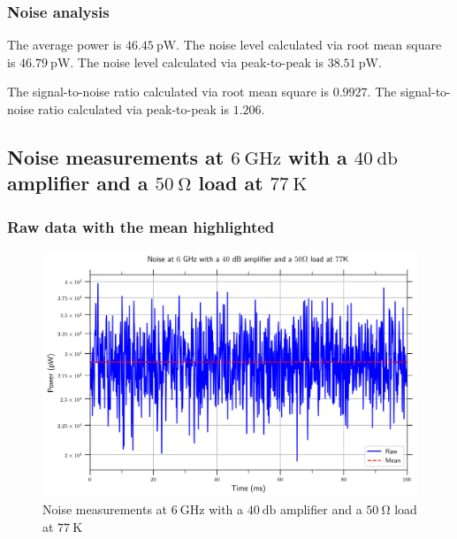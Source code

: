 \documentclass[english,12pt,a4paper]{article}
\begin{document}
\hypertarget{noise-analysis}{%
	\subsubsection{Noise analysis}\label{noise-analysis_4}}



	The average power is $\qty{46.45}{\pico\watt}$.
	The noise level calculated via root mean square is $\qty{46.79}{\pico\watt}$.
	The noise level calculated via peak-to-peak is $\qty{38.51}{\pico\watt}$.
	
	The signal-to-noise ratio calculated via root mean square is $0.9927$.
	The signal-to-noise ratio calculated via peak-to-peak is $1.206$.
	
\subsection{Noise measurements at $\qty{6}{\giga\hertz}$ with a $\qty{40}{\decibel}$ amplifier and a $\qty{50}{\ohm}$ load at $\qty{77}{\kelvin}$}

\hypertarget{raw-data-with-the-mean-highlighted}{%
	\subsubsection{Raw data with the mean
		highlighted}\label{raw-data-with-the-mean-highlighted_7}}

\begin{figure}[H]
	\includegraphics[width=1\linewidth]{Plots/noise_floor_6_GHz_amplif_50ohm_lt}
	\caption{Noise measurements at $\qty{6}{\giga\hertz}$ with a $\qty{40}{\decibel}$ amplifier and a $\qty{50}{\ohm}$ load at $\qty{77}{\kelvin}$}
	\label{fig:noisefloor6ghzamplif50ohmlt}
\end{figure}
\end{document}
